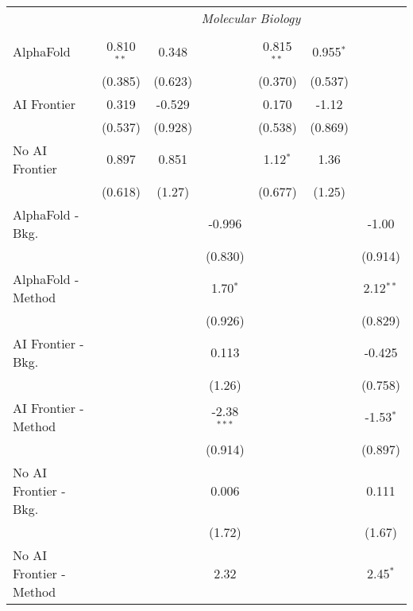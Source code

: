 \begin{tabular}{lcccccc}
 & \multicolumn{6}{c}{\textit{Molecular Biology}} \\ \\
   AlphaFold               & 0.810$^{**}$ & 0.348   &               & 0.815$^{**}$ & 0.955$^{*}$ &   \\   
                           & (0.385)      & (0.623) &               & (0.370)      & (0.537)     &   \\   
   AI Frontier             & 0.319        & -0.529  &               & 0.170        & -1.12       &   \\   
                           & (0.537)      & (0.928) &               & (0.538)      & (0.869)     &   \\   
   No AI Frontier          & 0.897        & 0.851   &               & 1.12$^{*}$   & 1.36        &   \\   
                           & (0.618)      & (1.27)  &               & (0.677)      & (1.25)      &   \\   
   AlphaFold - Bkg.        &              &         & -0.996        &              &             & -1.00\\   
                           &              &         & (0.830)       &              &             & (0.914)\\   
   AlphaFold - Method      &              &         & 1.70$^{*}$    &              &             & 2.12$^{**}$\\   
                           &              &         & (0.926)       &              &             & (0.829)\\   
   AI Frontier - Bkg.      &              &         & 0.113         &              &             & -0.425\\   
                           &              &         & (1.26)        &              &             & (0.758)\\   
   AI Frontier - Method    &              &         & -2.38$^{***}$ &              &             & -1.53$^{*}$\\   
                           &              &         & (0.914)       &              &             & (0.897)\\   
   No AI Frontier - Bkg.   &              &         & 0.006         &              &             & 0.111\\   
                           &              &         & (1.72)        &              &             & (1.67)\\   
   No AI Frontier - Method &              &         & 2.32          &              &             & 2.45$^{*}$\\   

\end{tabular}
